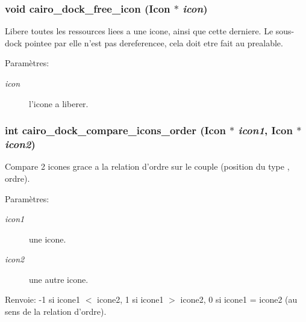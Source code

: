 \subsubsection{\setlength{\rightskip}{0pt plus 5cm}void cairo\_\-dock\_\-free\_\-icon ({\bf Icon} $\ast$ {\em icon})}\label{cairo-dock-icons_8c_f54199a4215a71f8b017ceb6512366f9}


Libere toutes les ressources liees a une icone, ainsi que cette derniere. Le sous-dock pointee par elle n'est pas dereferencee, cela doit etre fait au prealable. \begin{Desc}
\item[Param\`{e}tres:]
\begin{description}
\item[{\em icon}]l'icone a liberer. \end{description}
\end{Desc}
\subsubsection{\setlength{\rightskip}{0pt plus 5cm}int cairo\_\-dock\_\-compare\_\-icons\_\-order ({\bf Icon} $\ast$ {\em icon1}, {\bf Icon} $\ast$ {\em icon2})}\label{cairo-dock-icons_8c_a4e008f173bb3255251da119e4173c3b}


Compare 2 icones grace a la relation d'ordre sur le couple (position du type , ordre). \begin{Desc}
\item[Param\`{e}tres:]
\begin{description}
\item[{\em icon1}]une icone. \item[{\em icon2}]une autre icone. \end{description}
\end{Desc}
\begin{Desc}
\item[Renvoie:]-1 si icone1 $<$ icone2, 1 si icone1 $>$ icone2, 0 si icone1 = icone2 (au sens de la relation d'ordre). \end{Desc}
